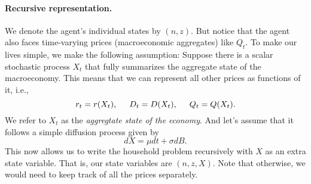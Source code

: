 \documentclass[11pt]{extarticle}
\theoremstyle{plain}
\theoremstyle{definition}
\begin{document}
\paragraph{Recursive representation.} 
We denote the agent's individual states by $(n, z)$. But notice that the agent also faces time-varying prices (macroeconomic aggregates) like $Q_t$. To make our lives simple, we make the following assumption: Suppose there is a scalar stochastic process $X_t$ that fully summarizes the aggregate state of the macroeconomy. This means that we can represent all other prices as functions of it, i.e., 
\begin{equation*}
	r_t = r(X_t), \hspace{5mm}	D_t = D(X_t), \hspace{5mm}	Q_t = Q(X_t).
\end{equation*}
We refer to $X_t$ as the \textit{aggregtate state of the economy}. And let's assume that it follows a simple diffusion process given by
\begin{equation*}
	d X = \mu dt + \sigma dB.
\end{equation*}
This now allows us to write the household problem recursively with $X$ as an extra state variable. That is, our state variables are $(n, z, X)$. Note that otherwise, we would need to keep track of all the prices separately. 
\end{document}
